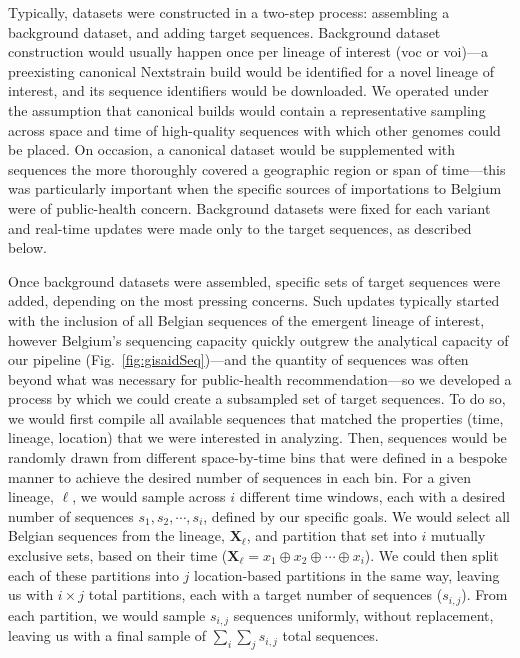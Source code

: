 Typically, datasets were constructed in a two-step process: assembling a background dataset, and adding target sequences.
Background dataset construction would usually happen once per lineage of interest (\gls{voc} or \gls{voi})---a preexisting canonical Nextstrain build would be identified for a novel lineage of interest, and its sequence identifiers would be downloaded.
We operated under the assumption that canonical builds would contain a representative sampling across space and time of high-quality sequences with which other genomes could be placed.
On occasion, a canonical dataset would be supplemented with sequences the more thoroughly covered a geographic region or span of time---this was particularly important when the specific sources of importations to Belgium were of public-health concern.
Background datasets were fixed for each variant and real-time updates were made only to the target sequences, as described below.

Once background datasets were assembled, specific sets of target sequences were added, depending on the most pressing concerns.
Such updates typically started with the inclusion of all Belgian sequences of the emergent lineage of interest, however Belgium's sequencing capacity quickly outgrew the analytical capacity of our pipeline (Fig.~\ref{fig:gisaidSeq})---and the quantity of sequences was often beyond what was necessary for public-health recommendation---so we developed a process by which we could create a subsampled set of target sequences.
To do so, we would first compile all available sequences that matched the properties (time, lineage, location) that we were interested in analyzing.
Then, sequences would be randomly drawn from different space-by-time bins that were defined in a bespoke manner to achieve the desired number of sequences in each bin.
For a given lineage, $\ell$, we would sample across $i$ different time windows, each with a desired number of sequences ${s_1,s_2,\cdots,s_i}$, defined by our specific goals.
We would select all Belgian sequences from the lineage, $\mathbf{X}_{\ell}$, and partition that set into $i$ mutually exclusive sets, based on their time ($\mathbf{X}_{\ell} = x_1 \oplus x_2 \oplus \cdots \oplus x_i$).
We could then split each of these partitions into $j$ location-based partitions in the same way, leaving us with $i \times j$ total partitions, each with a target number of sequences ($s_{i,j}$).
From each partition, we would sample $s_{i,j}$ sequences uniformly, without replacement, leaving us with a final sample of $\sum_i \sum_j s_{i,j}$ total sequences.

